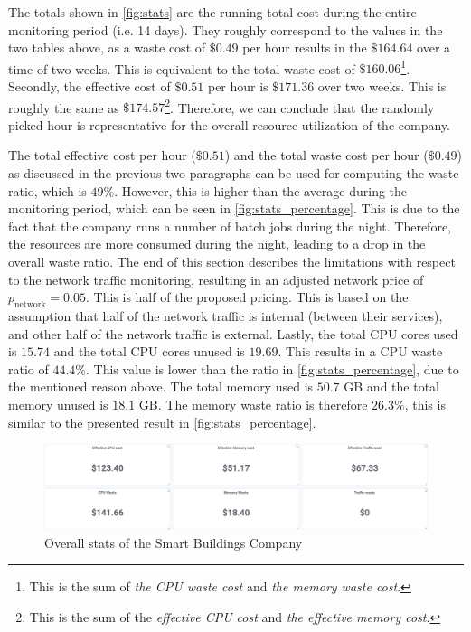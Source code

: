 \noindent
The totals shown in \autoref{fig:stats} are the running total cost during the entire monitoring period (i.e. 14 days). They roughly correspond to the values in the two tables above, as a waste cost of $\$0.49$ per hour results in the $\$164.64$ over a time of two weeks. This is equivalent to the total waste cost of $\$160.06$\footnote{This is the sum of \textit{the CPU waste cost} and \textit{the memory waste cost}.}. Secondly, the effective cost of $\$0.51$ per hour is $\$171.36$ over two weeks. This is roughly the same as $\$174.57$\footnote{This is the sum of the \textit{effective CPU cost} and \textit{the effective memory cost}.}. Therefore, we can conclude that the randomly picked hour is representative for the overall resource utilization of the company.


\noindent
The total effective cost per hour ($\$0.51$) and the total waste cost per hour ($\$0.49$) as discussed in the previous two paragraphs can be used for computing the waste ratio, which is $49\%$. However, this is higher than the average during the monitoring period, which can be seen in \autoref{fig:stats_percentage}. This is due to the fact that the company runs a number of batch jobs during the night. Therefore, the resources are more consumed during the night, leading to a drop in the overall waste ratio. The end of this section describes the limitations with respect to the network traffic monitoring, resulting in an adjusted network price of $p_\text{network} = 0.05$. This is half of the proposed pricing. This is based on the assumption that half of the network traffic is internal (between their services), and other half of the network traffic is external. Lastly, the total CPU cores used is $15.74$ and the total CPU cores unused is $19.69$. This results in a CPU waste ratio of $44.4\%$. This value is lower than the ratio in \autoref{fig:stats_percentage}, due to the mentioned reason above. The total memory used is $50.7$ GB and the total memory unused is $18.1$ GB. The memory waste ratio is therefore $26.3\%$, this is similar to the presented result in \autoref{fig:stats_percentage}.\\

\begin{figure}
    \centering
    \includegraphics[width=\textwidth]{gfx/stats.png}
    \caption{Overall stats of the Smart Buildings Company}
    \label{fig:stats}
\end{figure}

